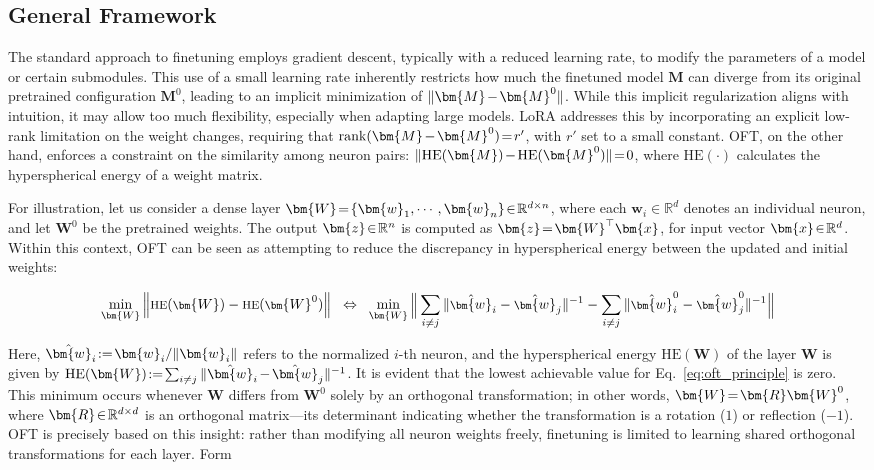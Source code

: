 \subsection{General Framework}

The standard approach to finetuning employs gradient descent, typically with a reduced learning rate, to modify the parameters of a model or certain submodules. This use of a small learning rate inherently restricts how much the finetuned model $\bm{M}$ can diverge from its original pretrained configuration $\bm{M}^0$, leading to an implicit minimization of $\thickmuskip=2mu \medmuskip=2mu \| \bm{M} - \bm{M}^0\|$. While this implicit regularization aligns with intuition, it may allow too much flexibility, especially when adapting large models. LoRA addresses this by incorporating an explicit low-rank limitation on the weight changes, requiring that $\thickmuskip=2mu \medmuskip=2mu \text{rank}(\bm{M} - \bm{M}^0)=r'$, with $r'$ set to a small constant. OFT, on the other hand, enforces a constraint on the similarity among neuron pairs: $\thickmuskip=2mu \medmuskip=2mu \| \text{HE}(\bm{M})-\text{HE}(\bm{M}^0) \|=0$, where $\text{HE}(\cdot)$ calculates the hyperspherical energy of a weight matrix. 

For illustration, let us consider a dense layer $\thickmuskip=2mu \medmuskip=2mu \bm{W}=\{\bm{w}_1,\cdots,\bm{w}_n\}\in\mathbb{R}^{d\times n}$, where each $\bm{w}_i\in\mathbb{R}^{d}$ denotes an individual neuron, and let $\bm{W}^0$ be the pretrained weights. The output $\thickmuskip=2mu \medmuskip=2mu \bm{z}\in\mathbb{R}^n$ is computed as $\thickmuskip=2mu \medmuskip=2mu \bm{z}=\bm{W}^\top\bm{x}$, for input vector $\thickmuskip=2mu \medmuskip=2mu \bm{x}\in\mathbb{R}^d$. Within this context, OFT can be seen as attempting to reduce the discrepancy in hyperspherical energy between the updated and initial weights:

\begin{equation}\label{eq:oft_principle}
\footnotesize
\min_{\bm{W}} \left\| \text{HE}(\bm{W})-\text{HE}(\bm{W}^0)\right\|~~\Leftrightarrow~~\min_{\bm{W}} \bigg{\|} \sum_{i\neq j} \|\hat{\bm{w}}_i-\hat{\bm{w}}_j\|^{-1}-\sum_{i\neq j} \|\hat{\bm{w}}^0_i-\hat{\bm{w}}^0_j\|^{-1}\bigg{\|}
\end{equation}

Here, $\thickmuskip=2mu \medmuskip=2mu \hat{\bm{w}}_i:=\bm{w}_i/\|\bm{w}_i\|$ refers to the normalized $i$-th neuron, and the hyperspherical energy $\text{HE}(\bm{W})$ of the layer $\bm{W}$ is given by $\thickmuskip=2mu \medmuskip=2mu \text{HE}(\bm{W}):= \sum_{i\neq j} \|\hat{\bm{w}}_i-\hat{\bm{w}}_j\|^{-1}$. It is evident that the lowest achievable value for Eq.~\eqref{eq:oft_principle} is zero. This minimum occurs whenever $\bm{W}$ differs from $\bm{W}^0$ solely by an orthogonal transformation; in other words, $\thickmuskip=2mu \medmuskip=2mu \bm{W}=\bm{R}\bm{W}^0$, where $\thickmuskip=2mu \medmuskip=2mu \bm{R}\in\mathbb{R}^{d\times d}$ is an orthogonal matrix—its determinant indicating whether the transformation is a rotation ($1$) or reflection ($-1$). OFT is precisely based on this insight: rather than modifying all neuron weights freely, finetuning is limited to learning shared orthogonal transformations for each layer. Form

